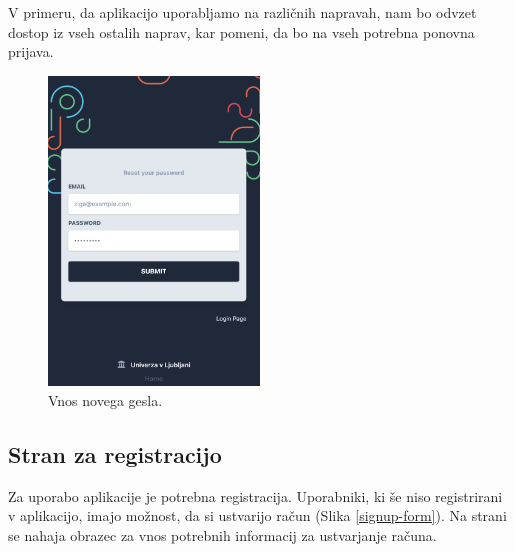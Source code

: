 \documentclass[a4paper, 12pt]{book}
\begin{document}
V primeru, da aplikacijo uporabljamo na različnih napravah, nam bo odvzet dostop iz vseh ostalih naprav, kar pomeni, da bo na vseh potrebna ponovna prijava.

\clearpage

\begin{figure}[h]
\begin{center}
\includegraphics[width=0.5\textwidth]{slike/reset_password.png}
\end{center}
\caption{ Vnos novega gesla. }
\label{password-reset-form}
\end{figure}

\subsection{Stran za registracijo }
\label{registration-page}
Za uporabo aplikacije je potrebna registracija. Uporabniki, ki še niso registrirani v aplikacijo, imajo možnost, da si ustvarijo račun (Slika \ref{signup-form}). Na strani se nahaja obrazec za vnos potrebnih informacij za ustvarjanje računa.
\end{document}
